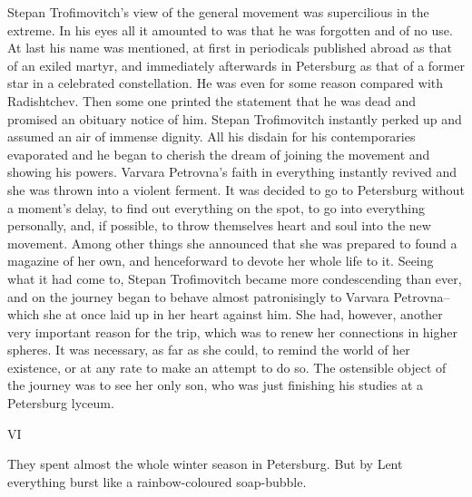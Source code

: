 \documentclass[12pt]{article}
\begin{document}
\vspace{12pt}
Stepan Trofimovitch's view of the general movement was supercilious in
the extreme. In his eyes all it amounted to was that he was forgotten
and of no use. At last his name was mentioned, at first in periodicals
published abroad as that of an exiled martyr, and immediately afterwards
in Petersburg as that of a former star in a celebrated constellation.
He was even for some reason compared with Radishtchev. Then some one
printed the statement that he was dead and promised an obituary notice
of him. Stepan Trofimovitch instantly perked up and assumed an air of
immense dignity. All his disdain for his contemporaries evaporated and
he began to cherish the dream of joining the movement and showing his
powers. Varvara Petrovna's faith in everything instantly revived and she
was thrown into a violent ferment. It was decided to go to Petersburg
without a moment's delay, to find out everything on the spot, to go into
everything personally, and, if possible, to throw themselves heart and
soul into the new movement. Among other things she announced that she
was prepared to found a magazine of her own, and henceforward to devote
her whole life to it. Seeing what it had come to, Stepan Trofimovitch
became more condescending than ever, and on the journey began to behave
almost patronisingly to Varvara Petrovna--which she at once laid up in
her heart against him. She had, however, another very important reason
for the trip, which was to renew her connections in higher spheres.
It was necessary, as far as she could, to remind the world of her
existence, or at any rate to make an attempt to do so. The ostensible
object of the journey was to see her only son, who was just finishing
his studies at a Petersburg lyceum.



\vspace{12pt}
VI


\vspace{12pt}
They spent almost the whole winter season in Petersburg. But by Lent
everything burst like a rainbow-coloured soap-bubble.
\end{document}

